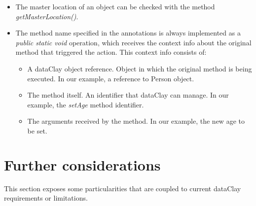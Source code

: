 \begin{itemize}
    \item The master location of an object can be checked with the method \textit{getMasterLocation()}.
    \item The method name specified in the annotations is always implemented as a \textit{public static void} operation, which receives the context info about the original method that triggered the action. This context info consists of:
 \begin{itemize}
    \item A dataClay object reference. Object in which the original method is being executed. In our example, a reference to Person object.
    \item The method itself. An identifier that dataClay can manage. In our example, the \textit{setAge} method identifier.
    \item The arguments received by the method. In our example, the new age to be set.
 \end{itemize}
\end{itemize}

\section{Further considerations}
\label{sec:JavaConsiderations}

This section exposes some particularities that are coupled to current dataClay requirements or limitations.

